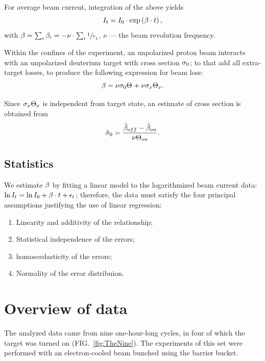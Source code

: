 \documentclass[reprint]{revtex4-1}
\begin{document}
For average beam current, integration of the above yields
\begin{equation}\label{eq:CurrentDecay}
	I_t = I_0 \cdot \exp\bkt{\slp\cdot t},
\end{equation}
with $\slp = \sum_i \slp[i] = - \nu\cdot\sum_i \sfrac1\tau_i$, $\nu$ --- the beam revolution frequency. 

Within the confines of the experiment, an unpolarized proton beam interacts with an unpolarized deuterium target with cross section $\CS[0]$; to that add all extra-target losses, to produce the following expression for beam loss:
\begin{equation}\label{eq:SlopeModel}
	\slp = \nu\CS[0]\Thick + \nu\CS[x]\Thick[x].
\end{equation}

Since $\CS[x]\Thick[x]$ is independent from target state, an estimate of cross section is obtained from 
\begin{equation}
	\CS*[0] = \frac{\slp*[off] - \slp*[on]}{\nu\Thick[on]}.
\end{equation}

\subsection{Statistics}

We estimate $\slp$ by fitting a linear model to the logarithmized beam current data: $\ln I_t = \ln I_0 + \slp\cdot t + \epsilon_t$; therefore, the data must satisfy the four principal assumptions justifying the use of linear regression:~\cite{RegDiag}
\begin{enumerate}
	\item Linearity and additivity of the relationship;
	\item Statistical independence of the errors;
	\item homoscedasticity of the errors;
	\item Normality of the error distribuion.
\end{enumerate}



\section{Overview of data}
The analyzed data came from nine one-hour-long cycles, in four of which the target was turned on (FIG.~\ref{fig:TheNine}). The experiments of this set were performed with an electron-cooled beam bunched using the barrier bucket.
\end{document}

